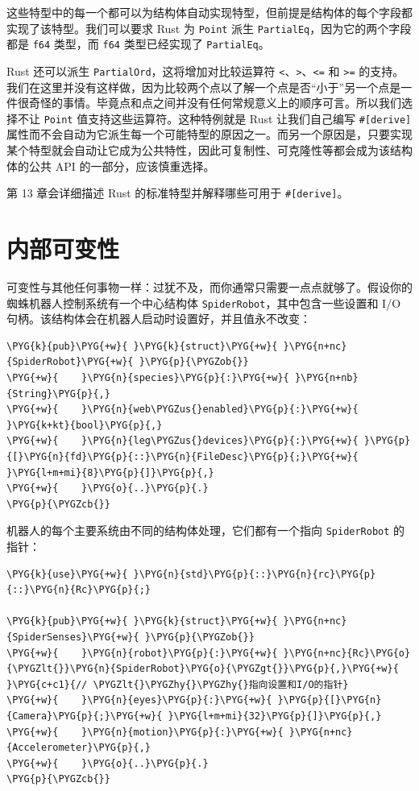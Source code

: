 这些特型中的每一个都可以为结构体自动实现特型，但前提是结构体的每个字段都实现了该特型。我们可以要求 Rust 为 \texttt{Point} 派生 \texttt{PartialEq}，因为它的两个字段都是 \texttt{f64} 类型，而 \texttt{f64} 类型已经实现了 \texttt{PartialEq}。

Rust 还可以派生 \texttt{PartialOrd}，这将增加对比较运算符 \texttt{<}、\texttt{>}、\texttt{<=} 和 \texttt{>=} 的支持。我们在这里并没有这样做，因为比较两个点以了解一个点是否“小于”另一个点是一件很奇怪的事情。毕竟点和点之间并没有任何常规意义上的顺序可言。所以我们选择不让 \texttt{Point} 值支持这些运算符。这种特例就是 Rust 让我们自己编写 \texttt{\#[derive]} 属性而不会自动为它派生每一个可能特型的原因之一。而另一个原因是，只要实现某个特型就会自动让它成为公共特性，因此可复制性、可克隆性等都会成为该结构体的公共 API 的一部分，应该慎重选择。

第 13 章会详细描述 Rust 的标准特型并解释哪些可用于 \texttt{\#[derive]}。

\section{内部可变性}

可变性与其他任何事物一样：过犹不及，而你通常只需要一点点就够了。假设你的蜘蛛机器人控制系统有一个中心结构体 \texttt{SpiderRobot}，其中包含一些设置和 I/O 句柄。该结构体会在机器人启动时设置好，并且值永不改变：

\begin{Verbatim}[commandchars=\\\{\},breaklines=true,breakanywhere=true,fontsize=\codefont,xleftmargin=17bp]
\PYG{k}{pub}\PYG{+w}{ }\PYG{k}{struct}\PYG{+w}{ }\PYG{n+nc}{SpiderRobot}\PYG{+w}{ }\PYG{p}{\PYGZob{}}
\PYG{+w}{    }\PYG{n}{species}\PYG{p}{:}\PYG{+w}{ }\PYG{n+nb}{String}\PYG{p}{,}
\PYG{+w}{    }\PYG{n}{web\PYGZus{}enabled}\PYG{p}{:}\PYG{+w}{ }\PYG{k+kt}{bool}\PYG{p}{,}
\PYG{+w}{    }\PYG{n}{leg\PYGZus{}devices}\PYG{p}{:}\PYG{+w}{ }\PYG{p}{[}\PYG{n}{fd}\PYG{p}{::}\PYG{n}{FileDesc}\PYG{p}{;}\PYG{+w}{ }\PYG{l+m+mi}{8}\PYG{p}{]}\PYG{p}{,}
\PYG{+w}{    }\PYG{o}{..}\PYG{p}{.}
\PYG{p}{\PYGZcb{}}
\end{Verbatim}

机器人的每个主要系统由不同的结构体处理，它们都有一个指向 \texttt{SpiderRobot} 的指针：

\begin{Verbatim}[commandchars=\\\{\},breaklines=true,breakanywhere=true,fontsize=\codefont,xleftmargin=17bp]
\PYG{k}{use}\PYG{+w}{ }\PYG{n}{std}\PYG{p}{::}\PYG{n}{rc}\PYG{p}{::}\PYG{n}{Rc}\PYG{p}{;}

\PYG{k}{pub}\PYG{+w}{ }\PYG{k}{struct}\PYG{+w}{ }\PYG{n+nc}{SpiderSenses}\PYG{+w}{ }\PYG{p}{\PYGZob{}}
\PYG{+w}{    }\PYG{n}{robot}\PYG{p}{:}\PYG{+w}{ }\PYG{n+nc}{Rc}\PYG{o}{\PYGZlt{}}\PYG{n}{SpiderRobot}\PYG{o}{\PYGZgt{}}\PYG{p}{,}\PYG{+w}{  }\PYG{c+c1}{// \PYGZlt{}\PYGZhy{}\PYGZhy{}指向设置和I/O的指针}
\PYG{+w}{    }\PYG{n}{eyes}\PYG{p}{:}\PYG{+w}{ }\PYG{p}{[}\PYG{n}{Camera}\PYG{p}{;}\PYG{+w}{ }\PYG{l+m+mi}{32}\PYG{p}{]}\PYG{p}{,}
\PYG{+w}{    }\PYG{n}{motion}\PYG{p}{:}\PYG{+w}{ }\PYG{n+nc}{Accelerometer}\PYG{p}{,}
\PYG{+w}{    }\PYG{o}{..}\PYG{p}{.}
\PYG{p}{\PYGZcb{}}
\end{Verbatim}

